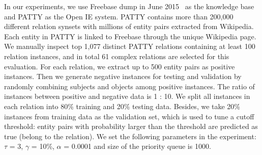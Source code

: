 In our experiments, we use Freebase dump in June 2015~\cite{freebase:datadumps} as the knowledge base
and PATTY \cite{nakashole2012patty} as the Open IE system.
PATTY contains more than 200,000 different relation synsets
with millions of entity pairs extracted from Wikipedia.
Each entity in PATTY is linked to Freebase through the unique Wikipedia page.
We manually inspect top 1,077 distinct PATTY relations containing at least 100 relation instances,
and in total 61 complex relations are selected for this evaluation.
For each relation, we extract up to 500 entity pairs as positive instances.
Then we generate negative instances for testing and validation by
randomly combining subjects and objects among positive instances.
The ratio of instances between positive and negative data is 1 : 10.
We split all instances in each relation into 80\% training and 20\% testing data.
Besides, we take 20\% instances from training data as the validation set,
which is used to tune a cutoff threshold: entity pairs with probability
larger than the threshold are predicted as true (belong to the relation).
We set the following parameters in the experiment:
$\tau$ = 3, $\gamma$ = 10\%, $\alpha$ = 0.0001 and size of the priority queue is 1000.

